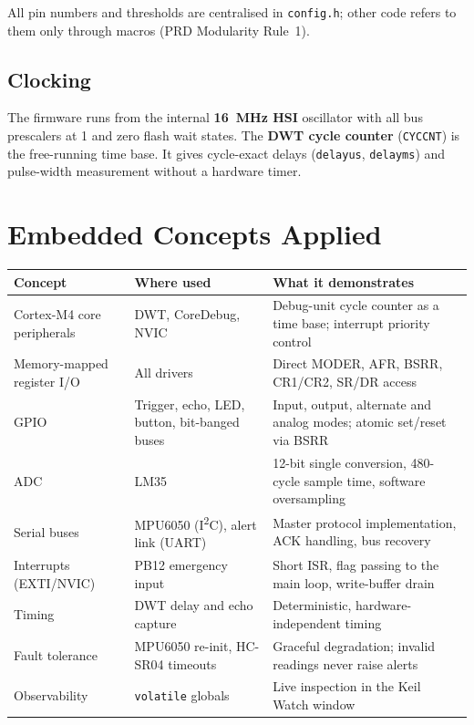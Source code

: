 \documentclass[11pt,a4paper]{article}
\newcommand{\ttu}{\textunderscore}
\begin{document}
All pin numbers and thresholds are centralised in \texttt{config.h}; other code refers to them only through macros (PRD Modularity Rule~1).

\subsection{Clocking}
The firmware runs from the internal \textbf{16~MHz HSI} oscillator with all bus prescalers at 1 and zero flash wait states. The \textbf{DWT cycle counter} (\texttt{CYCCNT}) is the free-running time base. It gives cycle-exact delays (\texttt{delay\ttu us}, \texttt{delay\ttu ms}) and pulse-width measurement without a hardware timer.

\section{Embedded Concepts Applied}
\begin{tabularx}{\textwidth}{@{}L{3.4cm} L{3.6cm} X@{}}
\toprule
\textbf{Concept} & \textbf{Where used} & \textbf{What it demonstrates}\\
\midrule
Cortex-M4 core peripherals & DWT, CoreDebug, NVIC & Debug-unit cycle counter as a time base; interrupt priority control\\
Memory-mapped register I/O & All drivers & Direct MODER, AFR, BSRR, CR1/CR2, SR/DR access\\
GPIO & Trigger, echo, LED, button, bit-banged buses & Input, output, alternate and analog modes; atomic set/reset via BSRR\\
ADC & LM35 & 12-bit single conversion, 480-cycle sample time, software oversampling\\
Serial buses & MPU6050 (I\textsuperscript{2}C), alert link (UART) & Master protocol implementation, ACK handling, bus recovery\\
Interrupts (EXTI/NVIC) & PB12 emergency input & Short ISR, flag passing to the main loop, write-buffer drain\\
Timing & DWT delay and echo capture & Deterministic, hardware-independent timing\\
Fault tolerance & MPU6050 re-init, HC-SR04 timeouts & Graceful degradation; invalid readings never raise alerts\\
Observability & \texttt{volatile} globals & Live inspection in the Keil Watch window\\
\bottomrule
\end{tabularx}
\end{document}
